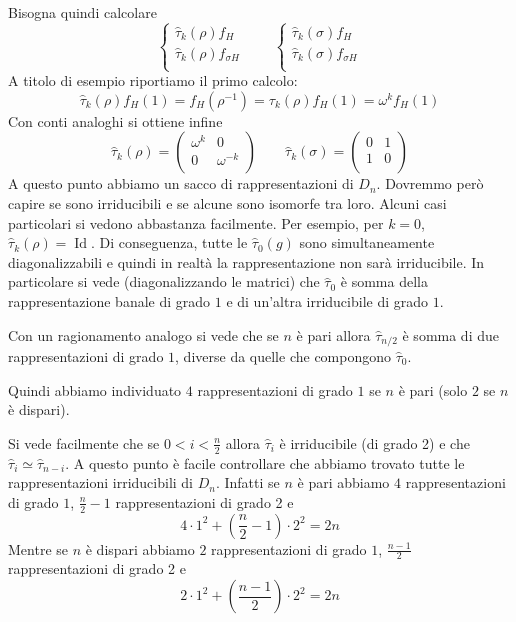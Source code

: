 \documentclass[11pt]{article}
\theoremstyle{plain}
\theoremstyle{definition}
\theoremstyle{remark}
\DeclareMathOperator{\Id}{Id}
\DeclareMathOperator{\iso}{\simeq}
\begin{document}
Bisogna quindi calcolare
\[
\begin{cases}
\hat \tau_k (\rho) f_H \\
\hat \tau_k (\rho) f_{\sigma H} \\
\end{cases}
\qquad
\begin{cases}
\hat \tau_k (\sigma) f_H \\
\hat \tau_k (\sigma) f_{\sigma H}\\
\end{cases}
\]
A titolo di esempio riportiamo il primo calcolo:
\[
\hat \tau_k (\rho) f_H(1) = f_H(\rho^{-1}) = \tau_k(\rho) f_H(1) = \omega^k f_H(1)
\]
Con conti analoghi si ottiene infine
\[
\hat \tau_k (\rho) =
\left(
\begin{array}{cc}
\omega^k & 0 \\
0 & \omega^{-k} \\
\end{array}
\right)
\qquad
\hat \tau_k (\sigma) =
\left(
\begin{array}{cc}
0 & 1 \\
1 & 0 \\
\end{array}
\right)
\]
A questo punto abbiamo un sacco di rappresentazioni di $D_{n}$. 
Dovremmo però capire se sono irriducibili e se alcune sono isomorfe tra loro.
Alcuni casi particolari si vedono abbastanza facilmente.
Per esempio, per $k=0$, $\hat \tau_k(\rho) = \Id$.
Di conseguenza, tutte le $\hat \tau_0(g)$ sono simultaneamente diagonalizzabili e quindi in realtà la rappresentazione non sarà irriducibile.
In particolare si vede (diagonalizzando le matrici) che $\hat\tau_0$ è somma della rappresentazione banale di grado $1$ e di un'altra irriducibile di grado $1$.

Con un ragionamento analogo si vede che se $n$ è pari allora $\hat\tau_{n/2}$ è somma di due rappresentazioni di grado $1$,
diverse da quelle che compongono $\hat\tau_0$.

Quindi abbiamo individuato $4$ rappresentazioni di grado $1$ se $n$ è pari (solo $2$ se $n$ è dispari).

Si vede facilmente che se $0<i<\frac{n}{2}$ allora $\hat\tau_i$ è irriducibile (di grado 2) e che $\hat\tau_i\iso\hat\tau_{n-i}$.
A questo punto è facile controllare che abbiamo trovato tutte le rappresentazioni irriducibili di $D_n$.
Infatti se $n$ è pari abbiamo $4$ rappresentazioni di grado $1$, $\frac{n}{2}-1$ rappresentazioni di grado 2 e 
\[ 4\cdot 1^2 + \left(\frac{n}{2}-1\right)\cdot 2^2 = 2n\]
Mentre se $n$ è dispari abbiamo $2$ rappresentazioni di grado $1$, $\frac{n-1}{2}$ rappresentazioni di grado 2 e 
\[ 2\cdot 1^2 + \left(\frac{n-1}{2}\right)\cdot 2^2 = 2n\]
\end{document}
